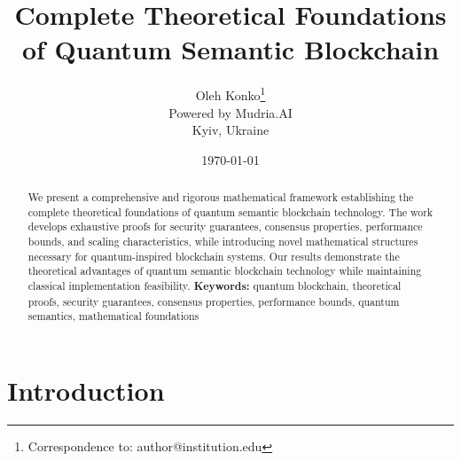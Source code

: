 \documentclass[12pt]{article}
\title{Complete Theoretical Foundations of Quantum Semantic Blockchain}
\author{Oleh Konko\thanks{Correspondence to: author@institution.edu}\\
\small{Powered by Mudria.AI}\\
\small{Kyiv, Ukraine}}
\date{\today}
\begin{document}
\maketitle
\begin{abstract}
We present a comprehensive and rigorous mathematical framework establishing the complete theoretical foundations of quantum semantic blockchain technology. The work develops exhaustive proofs for security guarantees, consensus properties, performance bounds, and scaling characteristics, while introducing novel mathematical structures necessary for quantum-inspired blockchain systems. Our results demonstrate the theoretical advantages of quantum semantic blockchain technology while maintaining classical implementation feasibility.
\textbf{Keywords:} quantum blockchain, theoretical proofs, security guarantees, consensus properties, performance bounds, quantum semantics, mathematical foundations
\end{abstract}
\tableofcontents
\section{Introduction}
\end{document}
